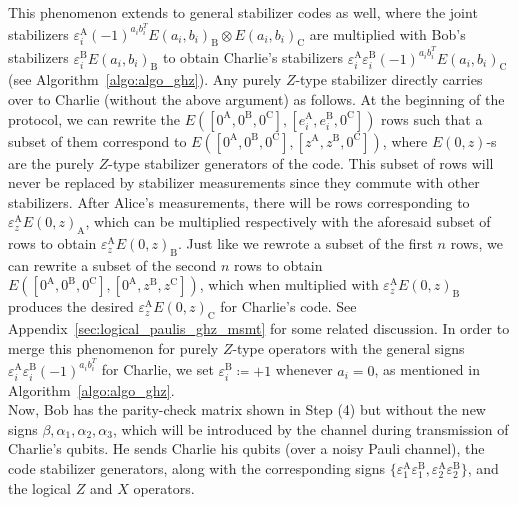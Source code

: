 \documentclass[journal,onecolumn]{IEEEtran}
\begin{document}
\begin{enumerate}
This phenomenon extends to general stabilizer codes as well, where the joint stabilizers $\varepsilon_i^{\text{A}} (-1)^{a_ib_i^T} E(a_i,b_i)_{\text{B}} \otimes E(a_i,b_i)_{\text{C}}$ are multiplied with Bob's stabilizers $\varepsilon_i^{\text{B}} E(a_i,b_i)_{\text{B}}$ to obtain Charlie's stabilizers $\varepsilon_i^{\text{A}} \varepsilon_i^{\text{B}} (-1)^{a_ib_i^T} E(a_i,b_i)_{\text{C}}$ (see Algorithm~\ref{algo:algo_ghz}).
Any purely $Z$-type stabilizer directly carries over to Charlie (without the above argument) as follows. 
At the beginning of the protocol, we can rewrite the $E([0^{\text{A}},0^{\text{B}},0^{\text{C}}],[e_i^{\text{A}},e_i^{\text{B}},0^{\text{C}}])$ rows such that a subset of them correspond to $E([0^{\text{A}},0^{\text{B}},0^{\text{C}}],[z^{\text{A}},z^{\text{B}},0^{\text{C}}])$, where $E(0,z)$-s are the purely $Z$-type stabilizer generators of the code.
This subset of rows will never be replaced by stabilizer measurements since they commute with other stabilizers.
After Alice's measurements, there will be rows corresponding to $\varepsilon_z^{\text{A}} E(0,z)_{\text{A}}$, which can be multiplied respectively with the aforesaid subset of rows to obtain $\varepsilon_z^{\text{A}} E(0,z)_{\text{B}}$.
Just like we rewrote a subset of the first $n$ rows, we can rewrite a subset of the second $n$ rows to obtain $E([0^{\text{A}},0^{\text{B}},0^{\text{C}}],[0^{\text{A}},z^{\text{B}},z^{\text{C}}])$, which when multiplied with $\varepsilon_z^{\text{A}} E(0,z)_{\text{B}}$ produces the desired $\varepsilon_z^{\text{A}} E(0,z)_{\text{C}}$ for Charlie's code.
See Appendix~\ref{sec:logical_paulis_ghz_msmt} for some related discussion.
In order to merge this phenomenon for purely $Z$-type operators with the general signs $\varepsilon_i^{\text{A}} \varepsilon_i^{\text{B}} (-1)^{a_ib_i^T}$ for Charlie, we set $\varepsilon_i^{\text{B}} \coloneqq +1$ whenever $a_i=0$, as mentioned in Algorithm~\ref{algo:algo_ghz}. \\

Now, Bob has the parity-check matrix shown in Step (4) but without the new signs $\beta, \alpha_1, \alpha_2, \alpha_3$, which will be introduced by the channel during transmission of Charlie's qubits.
He sends Charlie his qubits (over a noisy Pauli channel), the code stabilizer generators, along with the corresponding signs $\{ \varepsilon_1^{\text{A}} \varepsilon_1^{\text{B}}, \varepsilon_2^{\text{A}} \varepsilon_2^{\text{B}} \}$, and the logical $Z$ and $X$ operators. \\




\end{enumerate}
\end{document}
